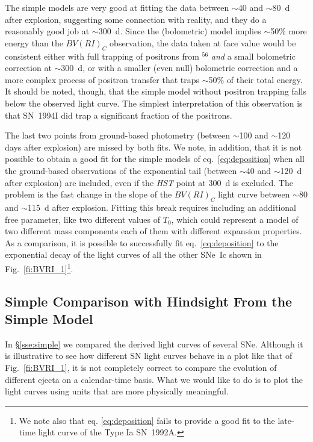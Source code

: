 \documentclass[12pt,manuscript]{aastex}
\begin{document}
The simple models are very good at fitting the data between 
$\sim$40 and $\sim$80~d after explosion,
suggesting some connection with reality, and they do a 
reasonably good job at $\sim$300~d.
%
Since the (bolometric) model implies $\sim$50\% more energy than
the $BV(RI)_C$ observation, the data taken at face value would
be consistent either with full trapping of positrons 
from $^{56}$ {\em and} a
small bolometric correction at $\sim$300~d, 
or with a smaller (even null) 
bolometric correction and a more complex process of 
positron transfer that traps $\sim$50\% of their total energy.
%
It should be noted, though, that the simple model without 
positron trapping falls below the observed light curve.
%
The simplest interpretation of this observation is that 
SN~1994I did trap a significant fraction of the positrons.


The last two points from ground-based photometry (between $\sim$100
and $\sim$120 days after explosion) are missed by both fits.
%
We note, in addition, that it is not possible to obtain a good
fit for the simple models of eq.~\ref{eq:deposition} when all
the ground-based observations of the exponential tail (between
$\sim$40 and $\sim$120~d after explosion) are included,
even if the {\em HST} point at 300~d is excluded.
%
The problem is the fast change in the slope 
of the $BV(RI)_C$ light curve between $\sim$80 
and $\sim$115~d after explosion.
%
Fitting this break requires including an 
additional free parameter, like
two different values of $T_0$, which
could represent a model of two different mass components
each of them with different expansion properties.
%
As a comparison, it is possible to successfully fit 
eq.~\ref{eq:deposition} to the exponential decay
of the light curves of all the other SNe~Ic shown in 
Fig.~\ref{fi:BVRI_1}\footnote{We note also that eq. \ref{eq:deposition} 
fails to provide a good fit to the late-time light curve of the 
Type Ia SN~1992A.}.

\subsection{Simple Comparison with Hindsight From the Simple Model} 
\label{sse:norm}

In \S \ref{sse:simple} we compared the derived
light curves of several SNe.
%
Although it is illustrative to see how different SN light 
curves behave in a plot like that of Fig.~\ref{fi:BVRI_1},
it is not completely correct to compare the evolution of 
different ejecta on a calendar-time basis.
%
What we would like to do is to plot the light curves using 
units that are more physically meaningful.
\end{document}
